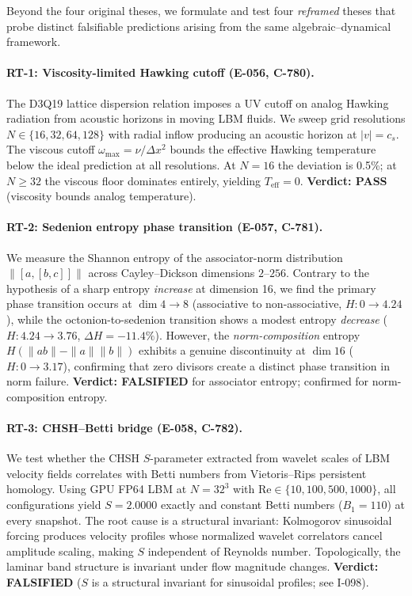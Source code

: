 \documentclass[12pt]{article}
\theoremstyle{definition}
\theoremstyle{plain}
\theoremstyle{remark}
\begin{document}
Beyond the four original theses, we formulate and test four \emph{reframed}
theses that probe distinct falsifiable predictions arising from the same
algebraic--dynamical framework.

\paragraph{RT-1: Viscosity-limited Hawking cutoff (E-056, C-780).}
The D3Q19 lattice dispersion relation imposes a UV cutoff on analog Hawking
radiation from acoustic horizons in moving LBM fluids.  We sweep grid
resolutions $N \in \{16,32,64,128\}$ with radial inflow producing an
acoustic horizon at $|v| = c_s$.  The viscous cutoff
$\omega_{\max} = \nu/\Delta x^2$ bounds the effective Hawking temperature
below the ideal prediction at all resolutions.  At $N=16$ the deviation is
0.5\%; at $N \geq 32$ the viscous floor dominates entirely, yielding
$T_{\mathrm{eff}} = 0$.  \textbf{Verdict: PASS} (viscosity bounds analog
temperature).

\paragraph{RT-2: Sedenion entropy phase transition (E-057, C-781).}
We measure the Shannon entropy of the associator-norm distribution
$\|[a,[b,c]]\|$ across Cayley--Dickson dimensions $2$--$256$.  Contrary to
the hypothesis of a sharp entropy \emph{increase} at dimension 16, we find
the primary phase transition occurs at $\dim 4 \to 8$ (associative to
non-associative, $H: 0 \to 4.24$), while the octonion-to-sedenion
transition shows a modest entropy \emph{decrease} ($H: 4.24 \to 3.76$,
$\Delta H = -11.4\%$).  However, the \emph{norm-composition} entropy
$H(\|ab\| - \|a\|\|b\|)$ exhibits a genuine discontinuity at $\dim 16$
($H: 0 \to 3.17$), confirming that zero divisors create a distinct phase
transition in norm failure.  \textbf{Verdict: FALSIFIED} for
associator entropy; confirmed for norm-composition entropy.

\paragraph{RT-3: CHSH--Betti bridge (E-058, C-782).}
We test whether the CHSH $S$-parameter extracted from wavelet scales of LBM
velocity fields correlates with Betti numbers from Vietoris--Rips persistent
homology.  Using GPU FP64 LBM at $N = 32^3$ with
$\mathrm{Re} \in \{10,100,500,1000\}$, all configurations yield
$S = 2.0000$ exactly and constant Betti numbers ($B_1 = 110$) at every
snapshot.  The root cause is a structural invariant: Kolmogorov sinusoidal
forcing produces velocity profiles whose normalized wavelet correlators
cancel amplitude scaling, making $S$ independent of Reynolds number.
Topologically, the laminar band structure is invariant under flow magnitude
changes.  \textbf{Verdict: FALSIFIED} ($S$ is a structural invariant for
sinusoidal profiles; see I-098).
\end{document}
